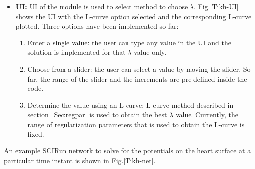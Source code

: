 \begin{itemize}
  \item {\bf UI:} UI of the  module is used to select
                method to choose $\lambda$. Fig.[Tikh-UI] shows the UI with
                the L-curve option selected and the corresponding L-curve
                plotted. Three options have been implemented so far:
        \begin{enumerate}         
          \item Enter a single value: the user can type any value in the UI
                and the solution is implemented for that $\lambda$ value
                only. 
          \item Choose from a slider: the user can select a value by moving
                the slider. So far, the range of the slider and the
                increments are pre-defined inside the code. 
          \item Determine the value using an L-curve: L-curve method
                described in section~\ref{Sec:regpar} is used to obtain the
                best $\lambda$ value. Currently, the range of
                regularization parameters that is used to obtain the
                L-curve is fixed. 
        \end{enumerate}
      
\end{itemize}

An example SCIRun network to solve for the potentials on the heart surface
at a particular time instant is shown in Fig.[Tikh-net]. 


\ModuleRefDetails

